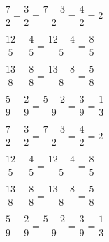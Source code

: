 \begin{alist}
\item $ \dfrac{7}{2}-\dfrac{3}{2}=\dfrac{7-3}{2}=\dfrac{4}{2}=2 $
\item $ \dfrac{12}{5}-\dfrac{4}{5}=\dfrac{12-4}{5}=\dfrac{8}{5} $
\item $ \dfrac{13}{8}-\dfrac{8}{8}=\dfrac{13-8}{8}=\dfrac{5}{8} $
\item $ \dfrac{5}{9}-\dfrac{2}{9}=\dfrac{5-2}{9}=\dfrac{3}{9}=\dfrac{1}{3} $
\end{alist}
\begin{alist}
\item $ \dfrac{7}{2}-\dfrac{3}{2}=\dfrac{7-3}{2}=\dfrac{4}{2}=2 $
\item $ \dfrac{12}{5}-\dfrac{4}{5}=\dfrac{12-4}{5}=\dfrac{8}{5} $
\item $ \dfrac{13}{8}-\dfrac{8}{8}=\dfrac{13-8}{8}=\dfrac{5}{8} $
\item $ \dfrac{5}{9}-\dfrac{2}{9}=\dfrac{5-2}{9}=\dfrac{3}{9}=\dfrac{1}{3} $
\end{alist}
